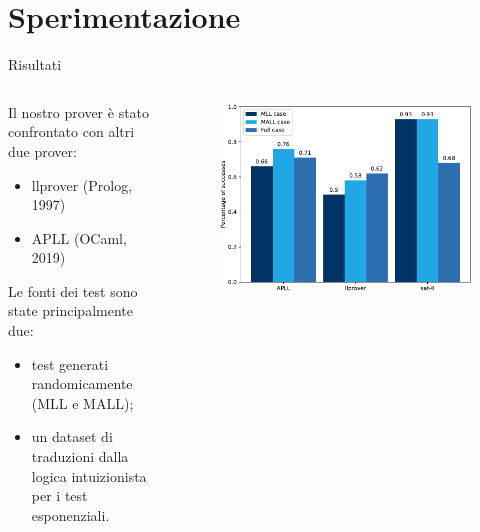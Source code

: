 \documentclass{beamer}
\begin{document}
\section{Sperimentazione}
\begin{frame}{Risultati}
	\begin{columns}
		\begin{column}{.5\textwidth}
			Il nostro prover è stato confrontato con altri due prover:
			\begin{itemize}
				\item llprover (Prolog, 1997)
				\item APLL (OCaml, 2019)
			\end{itemize}
			Le fonti dei test sono state principalmente due:
			\begin{itemize}
				\item test generati randomicamente (MLL e MALL);
				\item un dataset di traduzioni dalla logica intuizionista per i test esponenziali.
			\end{itemize}
		\end{column}
		\begin{column}{.5\textwidth}
			\begin{figure}[H]
				\centering
				\includegraphics[scale=.4]{images/graph}
			\end{figure}
		\end{column}
	\end{columns}
\end{frame}
\end{document}

